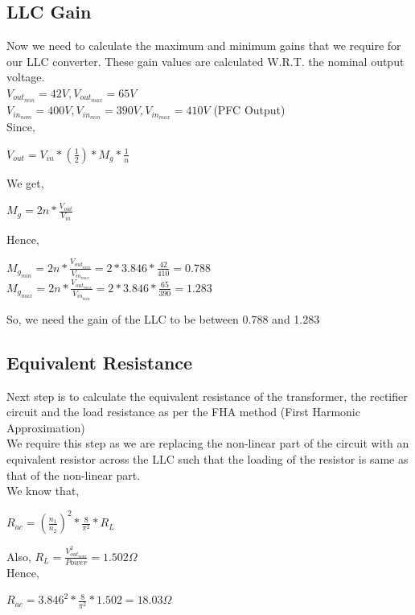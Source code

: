 \subsection{LLC Gain}
Now we need to calculate the maximum and minimum gains that we require for our LLC converter. These gain values are calculated W.R.T. the nominal output voltage.\\
$V_{out_{min}} = 42V, V_{out_{max}} = 65V$\\
$V_{in_{nom}} = 400V, V_{in_{min}} = 390V, V_{in_{max}} = 410V$ (PFC Output)\\
Since,
\begin{center}
    $V_{out} = V_{in} * (\frac{1}{2}) * M_g * \frac{1}{n}$
\end{center}
We get,
\begin{center}
    $M_g = 2n * \frac{V_{out}}{V_{in}}$
\end{center}
Hence,
\begin{center}
    $M_{g_{min}} = 2n * \frac{V_{out_{min}}}{V_{in_{max}}} = 2 * 3.846 * \frac{42}{410} = 0.788$\\
    $M_{g_{max}} = 2n * \frac{V_{out_{max}}}{V_{in_{min}}} = 2 * 3.846 * \frac{65}{390} = 1.283$\\
\end{center}
So, we need the gain of the LLC to be between 0.788 and 1.283

\subsection{Equivalent Resistance}
Next step is to calculate the equivalent resistance of the transformer, the rectifier circuit and the load resistance as per the FHA method (First Harmonic Approximation)\\
We require this step as we are replacing the non-linear part of the circuit with an equivalent resistor across the LLC such that the loading of the resistor is same as that of the non-linear part.\\
We know that,
\begin{center}
    $R_{ac} = (\frac{n_1}{n_2})^2 * \frac{8}{\pi^2} * R_L$\\
\end{center}
Also, $R_L = \frac{V_{out_{nom}}^2}{Power} = 1.502\Omega$\\
Hence,
\begin{center}
    $R_{ac} = 3.846^2 * \frac{8}{\pi^2} * 1.502 = 18.03\Omega$\\
\end{center}

